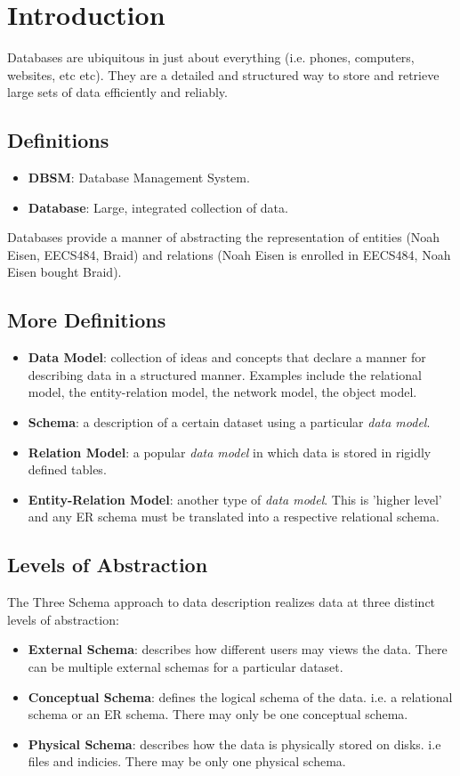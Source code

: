 \documentclass{article}
\begin{document}
\section{Introduction}

Databases are ubiquitous in just about everything (i.e. phones, computers, websites, etc etc). They are a detailed and structured way to store and retrieve large sets of data efficiently and reliably.

\subsection{Definitions}
\begin{itemize}
\item \textbf{DBSM}: Database Management System.
\item \textbf{Database}: Large, integrated collection of data. 
\end{itemize}

Databases provide a manner of abstracting the representation of entities (Noah Eisen, EECS484, Braid) and relations (Noah Eisen is enrolled in EECS484, Noah Eisen bought Braid).

\subsection{More Definitions}
\begin{itemize}
\item \textbf{Data Model}: collection of ideas and concepts that declare a manner for describing data in a structured manner. Examples include the relational model, the entity-relation model, the network model, the object model.
\item \textbf{Schema}: a description of a certain dataset using a particular \textit{data model}.
\item \textbf{Relation Model}: a popular \textit{data model} in which data is stored in rigidly defined tables.
\item \textbf{Entity-Relation Model}: another type of \textit{data model}. This is 'higher level' and any ER schema must be translated into a respective relational schema.
\end{itemize}

\subsection{Levels of Abstraction}

The Three Schema approach to data description realizes data at three distinct levels of abstraction:
\begin{itemize}
\item \textbf{External Schema}: describes how different users may views the data. There can be multiple external schemas for a particular dataset.
\item \textbf{Conceptual Schema}: defines the logical schema of the data. i.e. a relational schema or an ER schema. There may only be one conceptual schema.
\item \textbf{Physical Schema}: describes how the data is physically stored on disks. i.e files and indicies. There may be only one physical schema.
\end{itemize}
\end{document}
